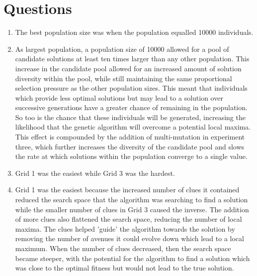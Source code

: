 \documentclass[10pt]{article}
\begin{document}
\section{Questions}
\begin{enumerate}[label=(\alph*)]
\item The best population size was when the population equalled 10000 individuals.

\item As largest population, a population size of 10000 allowed for a pool of candidate solutions at least ten times larger than any other population. This increase in the candidate pool allowed for an increased amount of solution diversity within the pool, while still maintaining the same proportional selection pressure as the other population sizes. This meant that individuals which provide less optimal solutions but may lead to a solution over successive generations have a greater chance of remaining in the population. So too is the chance that these individuals will be generated, increasing the likelihood that the genetic algorithm will overcome a potential local maxima. This effect is compounded by the addition of multi-mutation in experiment three, which further increases the diversity of the candidate pool and slows the rate at which solutions within the population converge to a single value.

\item Grid 1 was the easiest while Grid 3 was the hardest.

\item Grid 1 was the easiest because the increased number of clues it contained reduced the search space that the algorithm was searching to find a solution while the smaller number of clues in Grid 3 caused the inverse. The addition of more clues also flattened the search space, reducing the number of local maxima. The clues helped 'guide' the algorithm towards the solution by removing the number of avenues it could evolve down which lead to a local maximum. When the number of clues decreased, then the search space became steeper, with the potential for the algorithm to find a solution which was close to the optimal fitness but would not lead to the true solution.


\end{enumerate}
\end{document}
